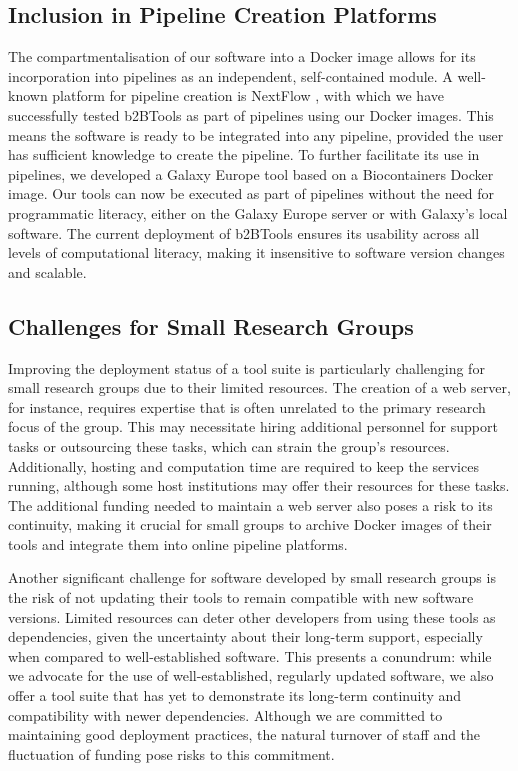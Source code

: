 \subsection{Inclusion in Pipeline Creation Platforms}

The compartmentalisation of our software into a Docker image allows for its incorporation into pipelines as an independent, self-contained module. A well-known platform for pipeline creation is NextFlow \cite{di_tommaso_nextflow_2017}, with which we have successfully tested b2BTools as part of pipelines using our Docker images. This means the software is ready to be integrated into any pipeline, provided the user has sufficient knowledge to create the pipeline. To further facilitate its use in pipelines, we developed a Galaxy Europe \cite{afgan_galaxy_2018} tool based on a Biocontainers Docker image. Our tools can now be executed as part of pipelines without the need for programmatic literacy, either on the Galaxy Europe server or with Galaxy's local software. The current deployment of b2BTools ensures its usability across all levels of computational literacy, making it insensitive to software version changes and scalable.


\subsection{Challenges for Small Research Groups}

Improving the deployment status of a tool suite is particularly challenging for small research groups due to their limited resources. The creation of a web server, for instance, requires expertise that is often unrelated to the primary research focus of the group. This may necessitate hiring additional personnel for support tasks or outsourcing these tasks, which can strain the group's resources. Additionally, hosting and computation time are required to keep the services running, although some host institutions may offer their resources for these tasks. The additional funding needed to maintain a web server also poses a risk to its continuity, making it crucial for small groups to archive Docker images of their tools and integrate them into online pipeline platforms.

Another significant challenge for software developed by small research groups is the risk of not updating their tools to remain compatible with new software versions. Limited resources can deter other developers from using these tools as dependencies, given the uncertainty about their long-term support, especially when compared to well-established software. This presents a conundrum: while we advocate for the use of well-established, regularly updated software, we also offer a tool suite that has yet to demonstrate its long-term continuity and compatibility with newer dependencies. Although we are committed to maintaining good deployment practices, the natural turnover of staff and the fluctuation of funding pose risks to this commitment.


